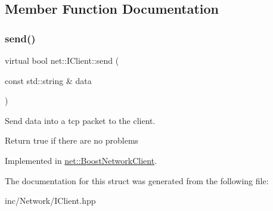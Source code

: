 \subsection{Member Function Documentation}
\mbox{\label{structnet_1_1IClient_a44691ffe41185a41b5637d7c0068b5f2}} 
\subsubsection{\texorpdfstring{send()}{send()}}
{\footnotesize\ttfamily virtual bool net\+::\+I\+Client\+::send (\begin{DoxyParamCaption}\item[{const std\+::string \&}]{data }\end{DoxyParamCaption})\hspace{0.3cm}{\ttfamily [pure virtual]}}



Send \textquotesingle{}data\textquotesingle{} into a tcp packet to the client. 

Return true if there are no problems 

Implemented in \hyperlink{classnet_1_1BoostNetworkClient_af584270d274c31b315eba24effd86b46}{net\+::\+Boost\+Network\+Client}.



The documentation for this struct was generated from the following file\+:\begin{DoxyCompactItemize}
\item 
inc/\+Network/I\+Client.\+hpp\end{DoxyCompactItemize}
